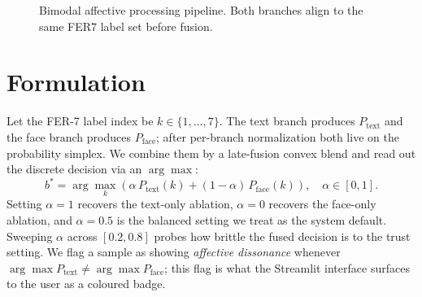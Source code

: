 \documentclass[sigconf,nonacm]{acmart}
\begin{document}
  \begin{figure}[t]
  \centering
  \caption{Bimodal affective processing pipeline. Both branches align to the same FER\texorpdfstring{$7$}{\,7} label set before fusion.}
  \label{fig:pipeline}
  \end{figure}

  \section{Formulation}
  Let the FER-7 label index be $k\in\{1,\ldots,7\}$. The text branch produces $P_\text{text}$ and the face branch produces $P_\text{face}$; after per-branch normalization both live on the probability simplex. We combine them by a late-fusion convex blend and read out the discrete decision via an $\arg\max$:
  \begin{equation}
    b^* = \arg\max_{k} \left( \alpha\, P_\text{text}(k) + (1-\alpha)\, P_\text{face}(k) \right), \quad \alpha\in[0,1].
    \label{eq:main}
  \end{equation}
  Setting $\alpha\!=\!1$ recovers the text-only ablation, $\alpha\!=\!0$ recovers the face-only ablation, and $\alpha\!=\!0.5$ is the balanced setting we treat as the system default. Sweeping $\alpha$ across $[0.2,0.8]$ probes how brittle the fused decision is to the trust setting. We flag a sample as showing \emph{affective dissonance} whenever $\arg\max P_\text{text}\neq\arg\max P_\text{face}$; this flag is what the Streamlit interface surfaces to the user as a coloured badge.
\end{document}
